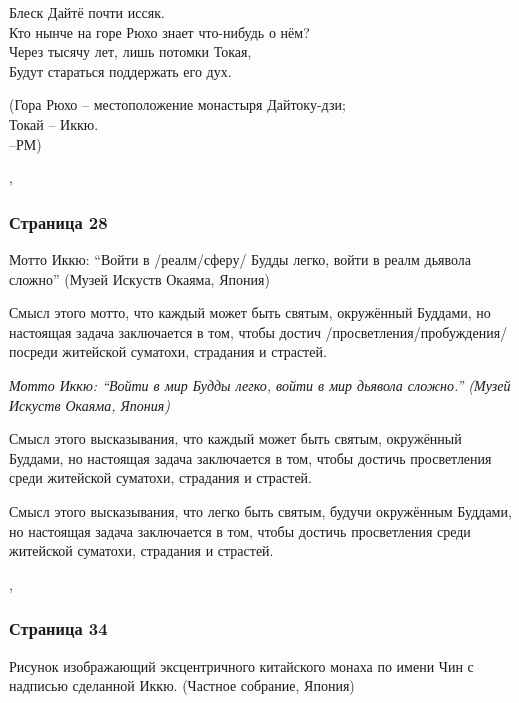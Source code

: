 \begin{ver}[2]
  \begin{verses}
    Блеск Дайтё почти иссяк.\\
    Кто нынче на горе Рюхо знает что-нибудь о
    нём?\\
    Через тысячу лет, лишь потомки Токая,\\
    Будут стараться поддержать его дух.
  \end{verses}

\noindent(Гора Рюхо -- местоположение монастыря Дайтоку-дзи;\\
Токай -- Иккю.\\
--РМ)
\end{ver}
\sep

\subsubsection{Страница 28}
\begin{ver}
Мотто Иккю: ``Войти в /реалм/сферу/ Будды легко, войти в реалм дьявола
сложно'' (Музей Искуств Окаяма, Япония)
\end{ver}

\begin{ver}
Смысл этого мотто, что каждый может быть святым, окружённый Буддами,
но настоящая задача заключается в том, чтобы достич
/просветления/пробуждения/ посреди житейской суматохи, страдания и страстей.  
\end{ver}

\begin{ver}[1]\it
Мотто Иккю: ``Войти в мир Будды легко, войти в мир дьявола
сложно.'' (Музей Искуств Окаяма, Япония)
\end{ver}

\begin{ver}[1]
Смысл этого высказывания, что каждый может быть святым, окружённый Буддами,
но настоящая задача заключается в том, чтобы достичь
просветления среди житейской суматохи, страдания и страстей.  
\end{ver}

\begin{ver}[2]
Смысл этого высказывания, что легко быть святым, будучи окружённым Буддами,
но настоящая задача заключается в том, чтобы достичь
просветления среди житейской суматохи, страдания и страстей.  
\end{ver}
\sep

\subsubsection{Страница 34}
\begin{ver}
Рисунок изображающий эксцентричного китайского монаха по имени Чин с надписью
сделанной Иккю. (Частное собрание, Япония)
\end{ver}

